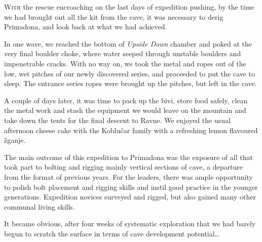 \newpage
\thispagestyle{endchapter}
\begin{tcolorbox}
	\vspace{80pt}
	\lettrine{W}{ith} the rescue encroaching on the last days of expedition pushing, by the time we had  brought out all the kit from the cave, it was necessary to derig Primadona, and look back at what we had achieved.

 	In one wave, we reached the bottom of \emph{Upside Down} chamber and poked at the very final boulder choke, where water seeped through unstable boulders and impenetrable cracks. With no way on, we took the metal and ropes out of the low, wet pitches of our newly discovered series, and proceeded to put the cave to sleep. The entrance series ropes were brought up the pitches, but left in the cave.

	A couple of days later, it was time to pack up the bivi, store food safely, clean the metal work and stash the equipment we would leave on the mountain and take down the tents for the final descent to Ravne. We enjoyed the usual afternoon cheese cake with the Koblu{\v{c}}ar family with a refreshing lemon flavoured {\v{z}}ganje.

	The main outcome of this expedition to Primadona was the exposure of all that took part to bolting and rigging mainly vertical sections of cave, a departure from the format of previous years. For the leaders, there was ample opportunity to polish bolt placement and rigging skills and instil good practice in the younger generations. Expedition novices surveyed and rigged, but also gained many other communal living skills.

	It became obvious, after four weeks of systematic exploration that we had barely begun to scratch the surface in terms of cave development potential…

\end{tcolorbox}

